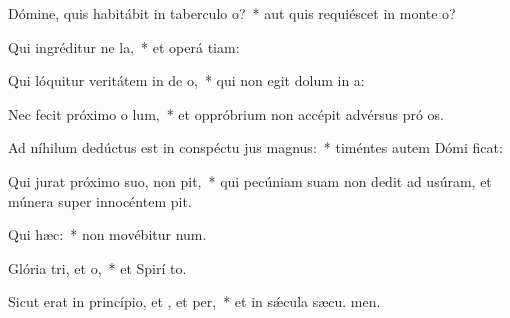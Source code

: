 \item Dómine, quis habitábit in taberculo o?~* aut quis requiéscet in monte  o?
\item Qui ingréditur ne la,~* et operá tiam:
\item Qui lóquitur veritátem in de o,~* qui non egit dolum in  a:
\item Nec fecit próximo o lum,~* et oppróbrium non accépit advérsus pró os.
\item Ad níhilum dedúctus est in conspéctu jus magnus:~* timéntes autem Dómi ficat:
\item Qui jurat próximo suo,  non pit,~* qui pecúniam suam non dedit ad usúram, et múnera super innocéntem  pit.
\item Qui  hæc:~* non movébitur  num.
\item Glória tri, et o,~* et Spirí to.
\item Sicut erat in princípio, et , et per,~* et in sǽcula sæcu. men.
